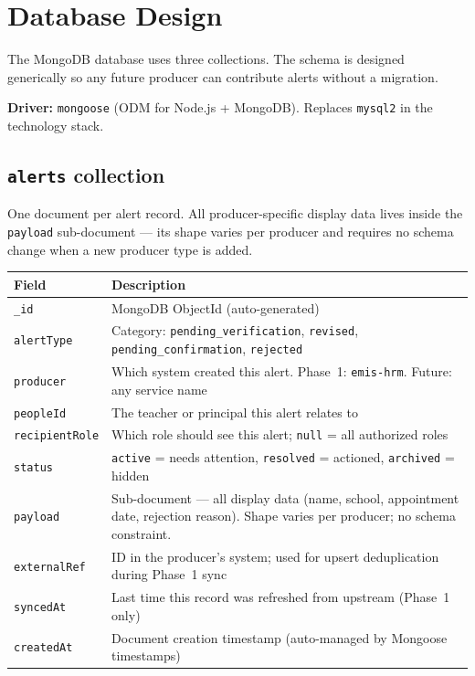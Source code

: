 \documentclass[11pt]{article}
\begin{document}
\section{Database Design}

The MongoDB database uses three collections. The schema is designed generically so any
future producer can contribute alerts without a migration.

\textbf{Driver:} \texttt{mongoose} (ODM for Node.js + MongoDB). Replaces \texttt{mysql2}
in the technology stack.

\subsection{\texttt{alerts} collection}

One document per alert record. All producer-specific display data lives inside the
\texttt{payload} sub-document --- its shape varies per producer and requires no schema change
when a new producer type is added.

\begin{table}[h]
\small
\begin{tabularx}{\textwidth}{l X}
\toprule
\textbf{Field} & \textbf{Description} \\
\midrule
\texttt{\_id} & MongoDB ObjectId (auto-generated) \\
\texttt{alertType} & Category: \texttt{pending\_verification}, \texttt{revised}, \texttt{pending\_confirmation}, \texttt{rejected} \\
\texttt{producer} & Which system created this alert. Phase~1: \texttt{emis-hrm}. Future: any service name \\
\texttt{peopleId} & The teacher or principal this alert relates to \\
\texttt{recipientRole} & Which role should see this alert; \texttt{null} = all authorized roles \\
\texttt{status} & \texttt{active} = needs attention, \texttt{resolved} = actioned, \texttt{archived} = hidden \\
\texttt{payload} & Sub-document --- all display data (name, school, appointment date, rejection reason). Shape varies per producer; no schema constraint. \\
\texttt{externalRef} & ID in the producer's system; used for upsert deduplication during Phase~1 sync \\
\texttt{syncedAt} & Last time this record was refreshed from upstream (Phase~1 only) \\
\texttt{createdAt} & Document creation timestamp (auto-managed by Mongoose timestamps) \\
\bottomrule
\end{tabularx}
\end{table}
\end{document}
